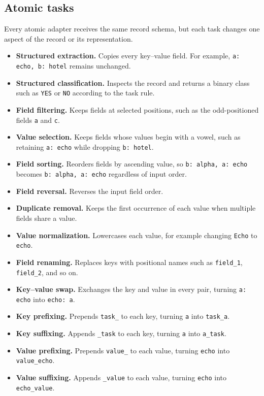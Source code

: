 \documentclass[10pt,twocolumn]{article}
\begin{document}
\subsection{Atomic tasks}

Every atomic adapter receives the same record schema, but each task changes one aspect of the record or its representation.
\begin{itemize}
    \item \textbf{Structured extraction.} Copies every key--value field. For example, \texttt{a: echo, b: hotel} remains unchanged.
    \item \textbf{Structured classification.} Inspects the record and returns a binary class such as \texttt{YES} or \texttt{NO} according to the task rule.
    \item \textbf{Field filtering.} Keeps fields at selected positions, such as the odd-positioned fields \texttt{a} and \texttt{c}.
    \item \textbf{Value selection.} Keeps fields whose values begin with a vowel, such as retaining \texttt{a: echo} while dropping \texttt{b: hotel}.
    \item \textbf{Field sorting.} Reorders fields by ascending value, so \texttt{b: alpha, a: echo} becomes \texttt{b: alpha, a: echo} regardless of input order.
    \item \textbf{Field reversal.} Reverses the input field order.
    \item \textbf{Duplicate removal.} Keeps the first occurrence of each value when multiple fields share a value.
    \item \textbf{Value normalization.} Lowercases each value, for example changing \texttt{Echo} to \texttt{echo}.
    \item \textbf{Field renaming.} Replaces keys with positional names such as \texttt{field\_1}, \texttt{field\_2}, and so on.
    \item \textbf{Key--value swap.} Exchanges the key and value in every pair, turning \texttt{a: echo} into \texttt{echo: a}.
    \item \textbf{Key prefixing.} Prepends \texttt{task\_} to each key, turning \texttt{a} into \texttt{task\_a}.
    \item \textbf{Key suffixing.} Appends \texttt{\_task} to each key, turning \texttt{a} into \texttt{a\_task}.
    \item \textbf{Value prefixing.} Prepends \texttt{value\_} to each value, turning \texttt{echo} into \texttt{value\_echo}.
    \item \textbf{Value suffixing.} Appends \texttt{\_value} to each value, turning \texttt{echo} into \texttt{echo\_value}.
\end{itemize}
\end{document}
